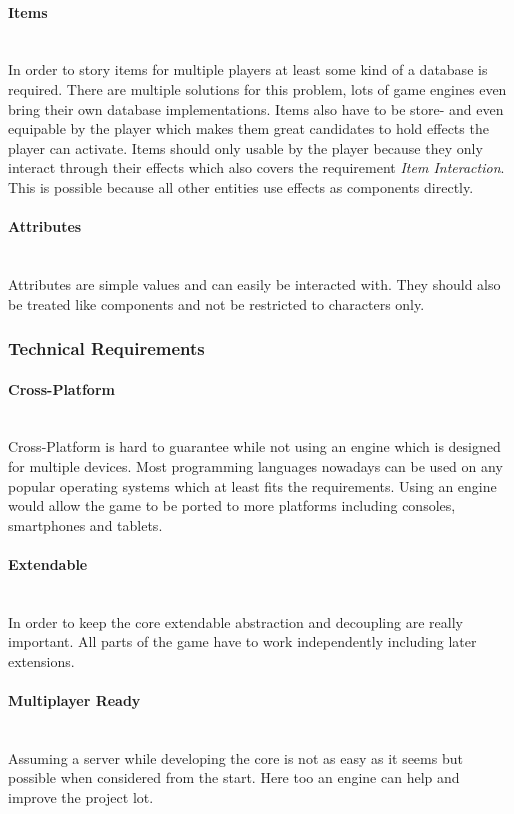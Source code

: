 \documentclass[11pt]{article}
\begin{document}
\paragraph{Items}~\\
In order to story items for multiple players at least some kind of a database is required. There are multiple solutions for this problem, lots of game engines even bring their own database implementations.
Items also have to be store- and even equipable by the player which makes them great candidates to hold effects the player can activate. Items should only usable by the player because they only interact through their effects which also covers the requirement \textit{Item Interaction}. 
This is possible because all other entities use effects as components directly.
\paragraph{Attributes}~\\
Attributes are simple values and can easily be interacted with.
They should also be treated like components and not be restricted to characters only.

\subsubsection{Technical Requirements}
\paragraph{Cross-Platform}~\\
Cross-Platform is hard to guarantee while not using an engine which is designed for multiple devices. Most programming languages nowadays can be used on any popular operating systems which at least fits the requirements.
Using an engine would allow the game to be ported to more platforms including consoles, smartphones and tablets.
\paragraph{Extendable}~\\
In order to keep the core extendable abstraction and decoupling are really important. All parts of the game have to work independently including later extensions.
\paragraph{Multiplayer Ready}~\\
Assuming a server while developing the core is not as easy as it seems but possible when considered from the start.
Here too an engine can help and improve the project lot.
\end{document}
